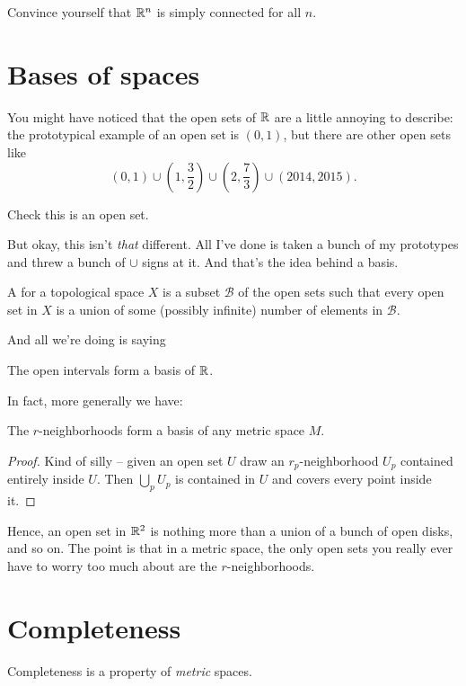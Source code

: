 \begin{ques}
	Convince yourself that $\mathbb R^n$ is simply connected for all $n$.
\end{ques}

\section{Bases of spaces}

You might have noticed that the open sets of $\RR$ are a little annoying to describe:
the prototypical example of an open set is $(0,1)$,
but there are other open sets like
\[
	(0,1)
	\cup \left( 1, \frac32 \right)
	\cup \left( 2, \frac 73 \right)
	\cup (2014, 2015). \]
\begin{ques}
	Check this is an open set.
\end{ques}

But okay, this isn't \emph{that} different.
All I've done is taken a bunch of my prototypes and threw a bunch of $\cup$ signs at it.
And that's the idea behind a basis.

\begin{definition}
	A  for a topological space $X$
	is a subset $\mathcal B$ of the open sets
	such that every open set in $X$
	is a union of some (possibly infinite) number of elements in
	$\mathcal B$.
\end{definition}

And all we're doing is saying
\begin{example}[Basis of $\RR$]
	The open intervals form a basis of $\RR$.
\end{example}
In fact, more generally we have:
\begin{theorem}
	The $r$-neighborhoods form a basis of any metric space $M$.
\end{theorem}
\begin{proof}
	Kind of silly -- given an open set $U$
	draw an $r_p$-neighborhood $U_p$ contained entirely inside $U$.
	Then $\bigcup_p U_p$ is contained in $U$ and covers
	every point inside it.
\end{proof}

Hence, an open set in $\mathbb R^2$ is nothing more than a union
of a bunch of open disks, and so on.
The point is that in a metric space, the only open sets you really
ever have to worry too much about are the $r$-neighborhoods.


\section{Completeness}
Completeness is a property of \emph{metric} spaces.

